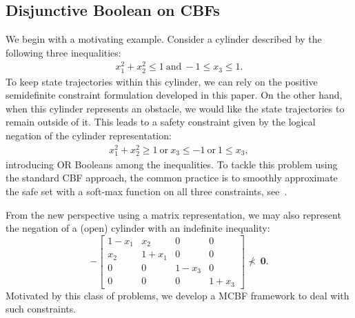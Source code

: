 \documentclass[10pt,twocolumn,twoside]{IEEEtran}
\theoremstyle{definition}
\newcommand{\bzero}{\mathbf{0}}
\begin{document}
\subsection{Disjunctive Boolean on CBFs}
We begin with a motivating example. Consider a cylinder described by the following three inequalities:
\begin{align*}
    x_1^2+x_2^2 \leq 1 ~\text{and}~ -1 \leq x_3\leq 1.
\end{align*}
To keep state trajectories within this cylinder, we can rely on the positive semidefinite constraint formulation developed in this paper. On the other hand, when this cylinder represents an obstacle, we would like the state trajectories to remain outside of it. This leads to a safety constraint given by the logical negation of the cylinder representation:
\begin{align*}
    x_1^2+x_2^2 \geq 1 ~\text{or}~ x_3\leq -1~\text{or}~ 1\leq x_3,
\end{align*}
introducing OR Booleans among the inequalities. To tackle this problem using the standard CBF approach, the common practice is to smoothly approximate the safe set with a soft-max function on all three constraints, see~\cite{TGM-ADA:23}.


From the new perspective using a matrix representation, we may also represent the negation of a (open) cylinder with an indefinite inequality:
$$
    -\begin{bmatrix}
        1-x_1 & x_2   & 0     & 0     \\
        x_2   & 1+x_1 & 0     & 0     \\
        0     & 0     & 1-x_3 & 0     \\
        0     & 0     & 0     & 1+x_3
    \end{bmatrix} \not \prec~ \bzero.
$$ Motivated by this class of problems, we develop a MCBF framework to deal with such constraints.
\end{document}
